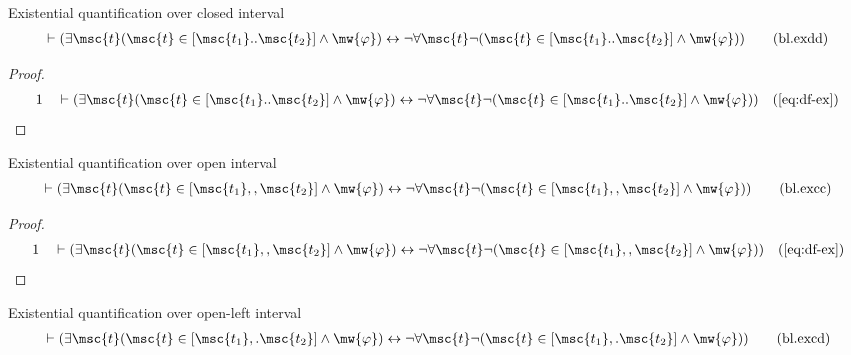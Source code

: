\begin{lemma} {Existential quantification over closed
interval}
\begin{align}
\vdash ( \exists \msc{t} ( \msc{t} \in [ \msc{t_1} .. \msc{t_2} ] \wedge
    \mw{\varphi} ) \leftrightarrow \lnot \forall \msc{t} \lnot ( \msc{t} \in [
    \msc{t_1} .. \msc{t_2} ] \wedge \mw{\varphi} )
    )\label{eq:bl.exdd}\tag{bl.exdd}
\end{align}
\end{lemma}


\begin{proof}
\begin{align}
  1 &&  & \vdash ( \exists \msc{t} ( \msc{t} \in [ \msc{t_1} .. \msc{t_2} ]
     \wedge \mw{\varphi} ) \leftrightarrow \lnot \forall
     \msc{t} \lnot ( \msc{t} \in [ \msc{t_1} .. \msc{t_2}
     ] \wedge \mw{\varphi} )
     )&(\mbox{\ref{eq:df-ex}})\notag
\end{align}
\end{proof}

\begin{lemma} {Existential quantification over open
interval}
\begin{align}
\vdash ( \exists \msc{t} ( \msc{t} \in [ \msc{t_1} ,, \msc{t_2} ] \wedge
    \mw{\varphi} ) \leftrightarrow \lnot \forall \msc{t} \lnot ( \msc{t} \in [
    \msc{t_1} ,, \msc{t_2} ] \wedge \mw{\varphi} )
    )\label{eq:bl.excc}\tag{bl.excc}
\end{align}
\end{lemma}


\begin{proof}
\begin{align}
  1 &&  & \vdash ( \exists \msc{t} ( \msc{t} \in [ \msc{t_1} ,, \msc{t_2} ]
     \wedge \mw{\varphi} ) \leftrightarrow \lnot \forall
     \msc{t} \lnot ( \msc{t} \in [ \msc{t_1} ,, \msc{t_2}
     ] \wedge \mw{\varphi} )
     )&(\mbox{\ref{eq:df-ex}})\notag
\end{align}
\end{proof}

\begin{lemma} {Existential quantification over open-left
interval}
\begin{align}
\vdash ( \exists \msc{t} ( \msc{t} \in [ \msc{t_1} ,. \msc{t_2} ] \wedge
    \mw{\varphi} ) \leftrightarrow \lnot \forall \msc{t} \lnot ( \msc{t} \in [
    \msc{t_1} ,. \msc{t_2} ] \wedge \mw{\varphi} )
    )\label{eq:bl.excd}\tag{bl.excd}
\end{align}
\end{lemma}


